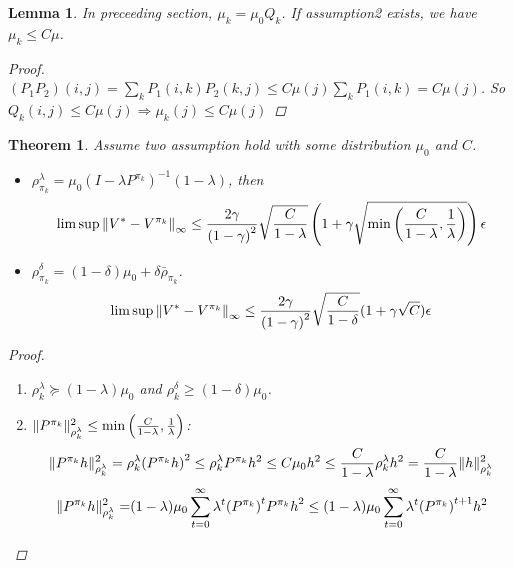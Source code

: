 \documentclass[a4paper]{article}
\newtheorem{lemma}{Lemma}
\newtheorem{theorem}{Theorem}
\begin{document}
\begin{lemma}
    In preceeding section, $ \mu_k = \mu_0 Q_k $. If assumption2 exists, we have $ \mu_k \le C \mu $.
    \begin{proof}
        $ (P_1 P_2)(i,j) = \sum^{}_{k} P_1(i,k) P_2(k,j) \le C \mu(j) \sum^{}_{k} P_1(i,k) = C\mu(j) $. So $ Q_k(i,j) \le C \mu(j) \Rightarrow \mu_k(j) \le C\mu(j)$
    \end{proof}
\end{lemma}
\begin{theorem}
    Assume two assumption hold with some distribution $ \mu_0 $ and $ C $.
    \begin{itemize}
        \item $ \rho^{\lambda}_{\pi_k} = \mu_0 {(I - \lambda P^{\pi_k})}^{-1}(1-\lambda) $, then
            \[
               \limsup {\Arrowvert V^* - V^{\pi_k} \Arrowvert}_\infty \le \frac{2\gamma}{{(1 - \gamma)}^{2}} \sqrt{\frac{C}{1 - \lambda} } \left( 1 + \gamma\sqrt{\min\left( \frac{C}{1 - \lambda} , \frac{1}{\lambda}  \right)} \right) \epsilon  
            \]
        \item $ \rho^{\delta}_{\pi_k} = (1 - \delta) \mu_0 + \delta \bar\rho_{\pi_k} $.
            \[
                \limsup {\Arrowvert V^* - V^{\pi_k} \Arrowvert}_\infty \le \frac{2\gamma}{{(1 - \gamma)}^{2}} \sqrt{\frac{C}{1 - \delta} }(1 + \gamma \sqrt C) \epsilon
            \]
    \end{itemize}
    \begin{proof}
        \begin{enumerate}
            \item $ \rho^{\lambda}_{k} \succeq (1 - \lambda)\mu_0 $ and $ \rho^{\delta}_{k} \ge (1 - \delta) \mu_0 $.
            \item $ \Arrowvert P^{\pi_k} \Arrowvert^{2}_{\rho^\lambda_k} \le \min\left( \frac{C}{1 - \lambda}, \frac{1}{\lambda}  \right) $:
                \[
                    \Arrowvert P^{\pi_k} h \Arrowvert^2_{\rho^{\lambda}_{k}} = \rho^{\lambda}_{k} {(P^{\pi_k} h)}^{2} \le \rho^{\lambda}_{k} P^{\pi_k}h^2 \le C \mu_0 h^2 \le \frac{C}{1 - \lambda} \rho^{\lambda}_{k}h^2 = \frac{C}{1 - \lambda} \Arrowvert h \Arrowvert^2_{\rho^{\lambda}_{k}}
                \]
                \begin{align*}
                    \Arrowvert P^{\pi_k} h \Arrowvert^2_{\rho^{\lambda}_{k}}
                    =& (1 - \lambda) \mu_0 \sum^{\infty}_{t=0} \lambda^t {(P^{\pi_k})}^{t} {{P^{\pi_k}h}}^{2}
                    \le (1 - \lambda) \mu_0 \sum^{\infty}_{t=0} \lambda^{t} {(P^{\pi_k})}^{t+1} h^2\\

\end{align*}
\end{enumerate}
\end{proof}
\end{theorem}
\end{document}
